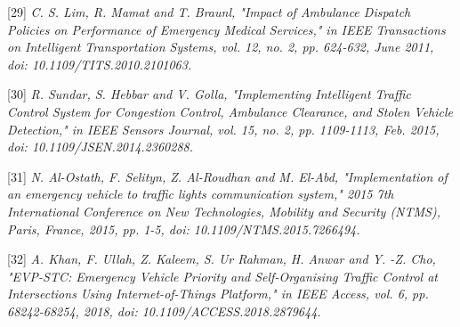 \documentclass[conference]{IEEEtran}
\begin{document}
[29] \emph{ C. S. Lim, R. Mamat and T. Braunl, "Impact of Ambulance Dispatch Policies on Performance of Emergency Medical Services," in IEEE Transactions on Intelligent Transportation Systems, vol. 12, no. 2, pp. 624-632, June 2011, doi: 10.1109/TITS.2010.2101063.}

[30]\emph{ R. Sundar, S. Hebbar and V. Golla, "Implementing Intelligent Traffic Control System for Congestion Control, Ambulance Clearance, and Stolen Vehicle Detection," in IEEE Sensors Journal, vol. 15, no. 2, pp. 1109-1113, Feb. 2015, doi: 10.1109/JSEN.2014.2360288. }

[31]\emph{ N. Al-Ostath, F. Selityn, Z. Al-Roudhan and M. El-Abd, "Implementation of an emergency vehicle to traffic lights communication system," 2015 7th International Conference on New Technologies, Mobility and Security (NTMS), Paris, France, 2015, pp. 1-5, doi: 10.1109/NTMS.2015.7266494.}

[32]\emph{ A. Khan, F. Ullah, Z. Kaleem, S. Ur Rahman, H. Anwar and Y. -Z. Cho, "EVP-STC: Emergency Vehicle Priority and Self-Organising Traffic Control at Intersections Using Internet-of-Things Platform," in IEEE Access, vol. 6, pp. 68242-68254, 2018, doi: 10.1109/ACCESS.2018.2879644.}
\end{document}
